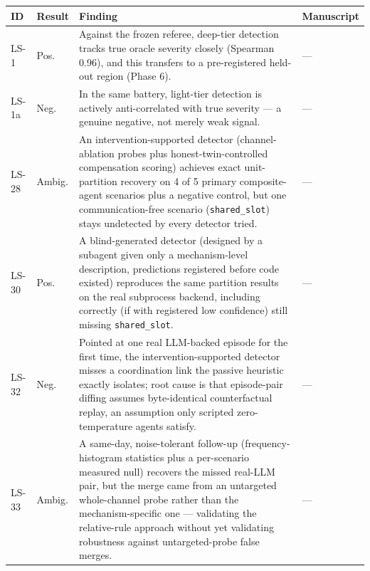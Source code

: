 \begin{longtable}{@{}L{0.05\textwidth}L{0.08\textwidth}L{0.55\textwidth}L{0.255\textwidth}@{}}
\toprule
\textbf{ID} & \textbf{Result} & \textbf{Finding} & \textbf{Manuscript} \\
\midrule
\endhead
\bottomrule
\endfoot
\label{finding:ls-1}LS-1 & Pos. & Against the frozen referee, deep-tier detection tracks true oracle severity closely (Spearman 0.96), and this transfers to a pre-registered held-out region (Phase 6). & --- \\
\label{finding:ls-1a}LS-1a & Neg. & In the same battery, light-tier detection is actively anti-correlated with true severity --- a genuine negative, not merely weak signal. & --- \\
\label{finding:ls-28}LS-28 & Ambig. & An intervention-supported detector (channel-ablation probes plus honest-twin-controlled compensation scoring) achieves exact unit-partition recovery on 4 of 5 primary composite-agent scenarios plus a negative control, but one communication-free scenario (\texttt{shared\_slot}) stays undetected by every detector tried. & --- \\
\label{finding:ls-30}LS-30 & Pos. & A blind-generated detector (designed by a subagent given only a mechanism-level description, predictions registered before code existed) reproduces the same partition results on the real subprocess backend, including correctly (if with registered low confidence) still missing \texttt{shared\_slot}. & --- \\
\label{finding:ls-32}LS-32 & Neg. & Pointed at one real LLM-backed episode for the first time, the intervention-supported detector misses a coordination link the passive heuristic exactly isolates; root cause is that episode-pair diffing assumes byte-identical counterfactual replay, an assumption only scripted zero-temperature agents satisfy. & --- \\
\label{finding:ls-33}LS-33 & Ambig. & A same-day, noise-tolerant follow-up (frequency-histogram statistics plus a per-scenario measured null) recovers the missed real-LLM pair, but the merge came from an untargeted whole-channel probe rather than the mechanism-specific one --- validating the relative-rule approach without yet validating robustness against untargeted-probe false merges. & --- \\
\end{longtable}
\normalsize
\renewcommand{\arraystretch}{1.0}

\authbarneedspace
